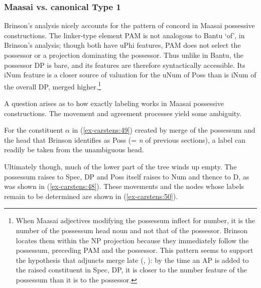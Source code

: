 \documentclass[output=paper
,modfonts
,nonflat]{langsci/langscibook}
\begin{document}
\subsubsection{Maasai vs. canonical Type 1} \label{sec-carstens:6.2.2}
Brinson's analysis nicely accounts for the pattern of concord in Maasai possessive constructions. The linker-type element PAM is not analogous to Bantu `of', in Brinson's analysis; though both have uPhi features, PAM does not select the possessor or a projection dominating the possessor. Thus unlike in Bantu, the possessor DP is bare, and its features are therefore syntactically accessible. Its iNum feature is a closer source of valuation for the uNum of Poss than is iNum of the overall DP, merged higher.\footnote{When Maasai adjectives modifying the possessum inflect for number, it is the number of the possessum head noun and not that of the possessor. Brinson locates them within the NP projection because they immediately follow the possessum, preceding PAM and the possessor. This pattern seems to support the hypothesis that adjuncts merge late (\citealt{Lebeaux1988}, \citealt{Chomsky1993}): by the time an AP is added to the raised constituent in Spec, DP, it is closer to the number feature of the possessum than it is to the possessor.} \textsuperscript{}  

A question arises as to how exactly labeling works in Maasai possessive constructions. The movement and agreement processes yield some ambiguity.

For the constituent $\alpha$ in (\ref{ex-carstens:49}) created by merge of the possessum and the head that Brinson identifies as Poss (= \textit{n} of previous sections), a label can readily be taken from the unambiguous head.  

\begin{figure}[!h]
	\begin{exe}
	\end{exe} \vspace{-1cm}
\end{figure}
\noindent Ultimately though, much of the lower part of the tree winds up empty. The possessum raises to Spec, DP and Poss itself raises to Num and thence to D, as was shown in (\ref{ex-carstens:48}). These movements and the nodes whose labels remain to be determined are shown in (\ref{ex-carstens:50}).
\end{document}
